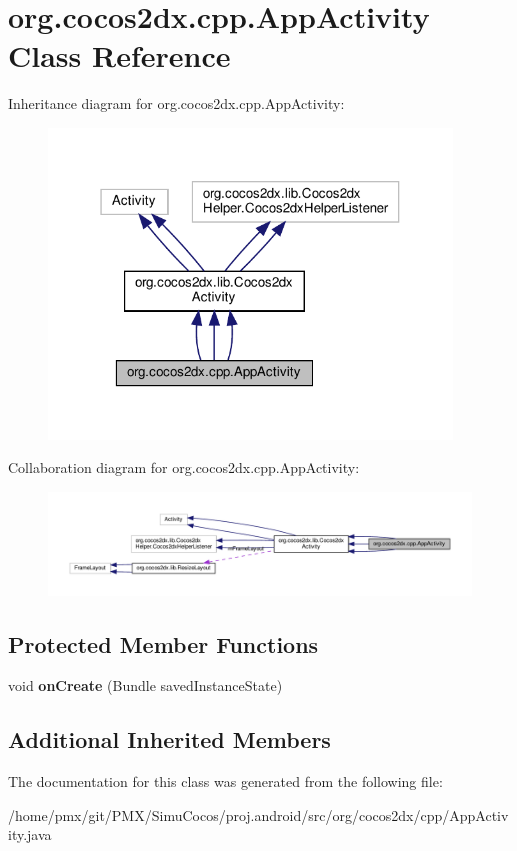\hypertarget{classorg_1_1cocos2dx_1_1cpp_1_1AppActivity}{}\section{org.\+cocos2dx.\+cpp.\+App\+Activity Class Reference}
\label{classorg_1_1cocos2dx_1_1cpp_1_1AppActivity}


Inheritance diagram for org.\+cocos2dx.\+cpp.\+App\+Activity\+:
\nopagebreak
\begin{figure}[H]
\begin{center}
\leavevmode
\includegraphics[width=304pt]{classorg_1_1cocos2dx_1_1cpp_1_1AppActivity__inherit__graph}
\end{center}
\end{figure}


Collaboration diagram for org.\+cocos2dx.\+cpp.\+App\+Activity\+:
\nopagebreak
\begin{figure}[H]
\begin{center}
\leavevmode
\includegraphics[width=350pt]{classorg_1_1cocos2dx_1_1cpp_1_1AppActivity__coll__graph}
\end{center}
\end{figure}
\subsection*{Protected Member Functions}
\begin{DoxyCompactItemize}
\item 
\mbox{\label{classorg_1_1cocos2dx_1_1cpp_1_1AppActivity_a8583f50f04ead54464c3141891d7d7e9}} 
void {\bfseries on\+Create} (Bundle saved\+Instance\+State)
\end{DoxyCompactItemize}
\subsection*{Additional Inherited Members}


The documentation for this class was generated from the following file\+:\begin{DoxyCompactItemize}
\item 
/home/pmx/git/\+P\+M\+X/\+Simu\+Cocos/proj.\+android/src/org/cocos2dx/cpp/App\+Activity.\+java\end{DoxyCompactItemize}
